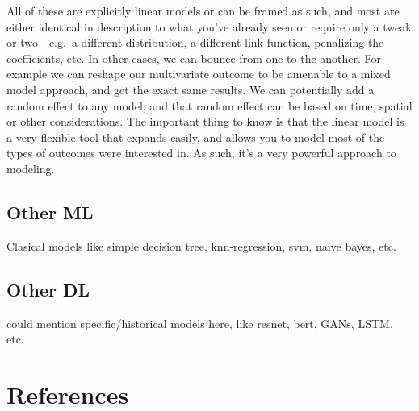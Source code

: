 \documentclass[
  letterpaper,
]{krantz}
\begin{document}
All of these are explicitly linear models or can be framed as such, and
most are either identical in description to what you've already seen or
require only a tweak or two - e.g.~a different distribution, a different
link function, penalizing the coefficients, etc. In other cases, we can
bounce from one to the another. For example we can reshape our
multivariate outcome to be amenable to a mixed model approach, and get
the exact same results. We can potentially add a random effect to any
model, and that random effect can be based on time, spatial or other
considerations. The important thing to know is that the linear model is
a very flexible tool that expands easily, and allows you to model most
of the types of outcomes were interested in. As such, it's a very
powerful approach to modeling.

\section{Other ML}\label{other-ml}

Clasical models like simple decision tree, knn-regression, svm, naive
bayes, etc.

\section{Other DL}\label{other-dl}

could mention specific/historical models here, like resnet, bert, GANs,
LSTM, etc.

\cleardoublepage
{}
{}
\appendix

\chapter{References}\label{references}
\end{document}
